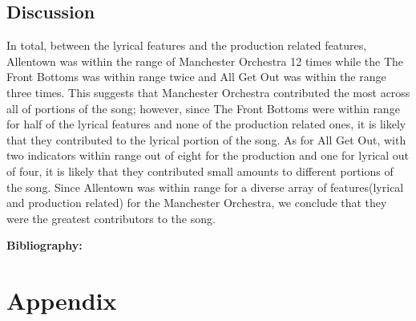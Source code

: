 \documentclass{article}\usepackage[]{graphicx}\usepackage[]{xcolor}
\begin{document}
\begin{multicols}{2}
\section{Discussion}
  In total, between the lyrical features and the production related features, Allentown was within the range of Manchester Orchestra 12 times while the The Front Bottoms was within range twice and All Get Out was within the range three times. This suggests that Manchester Orchestra contributed the most across all of portions of the song; however, since The Front Bottoms were within range for half of the lyrical features and none of the production related ones, it is likely that they contributed to the lyrical portion of the song. As for All Get Out, with two indicators within range out of eight for the production and one for lyrical out of four, it is likely that they contributed small amounts to different portions of the song.
  Since Allentown was within range for a diverse array of features(lyrical and production related) for the Manchester Orchestra, we conclude that they were the greatest contributors to the song. 

\vspace{2em}

\noindent\textbf{Bibliography:} 
\begin{tiny}

\end{tiny}
\end{multicols}

\newpage
\onecolumn
\section{Appendix}
\end{document}
